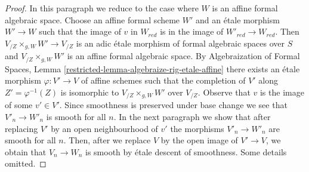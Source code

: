 \documentclass{stacks-project}
\theoremstyle{plain}
\theoremstyle{definition}
\theoremstyle{remark}
\numberwithin{equation}{subsection}
\begin{document}
\begin{proof}
\medskip\noindent
In this paragraph we reduce to the case where $W$ is an affine formal
algebraic space. Choose an affine formal scheme $W'$ and an \'etale morphism
$W' \to W$ such that the image of $v$ in $W_{red}$ is in the
image of $W'_{red} \to W_{red}$. Then $V_{/Z} \times_{g, W} W' \to V_{/Z}$
is an adic \'etale morphism of formal algebraic spaces over $S$
and $V_{/Z} \times_{g, W} W'$ is an affine formal algebraic space.
By Algebraization of Formal Spaces,
Lemma \ref{restricted-lemma-algebraize-rig-etale-affine}
there exists an \'etale morphism $\varphi : V' \to V$ of affine schemes
such that the completion of $V'$ along $Z' = \varphi^{-1}(Z)$
is isomorphic to $V_{/Z} \times_{g, W} W'$ over $V_{/Z}$.
Observe that $v$ is the image of some $v' \in V'$.
Since smoothness is preserved under base change we see that
$V'_n \to W'_n$ is smooth for all $n$. In the next paragraph
we show that after replacing $V'$ by an open neighbourhood of $v'$
the morphisms $V'_n \to W'_n$ are smooth for all $n$.
Then, after we replace $V$ by the open image of $V' \to V$,
we obtain that $V_n \to W_n$ is smooth by \'etale descent of smoothness.
Some details omitted.


\end{proof}
\end{document}
